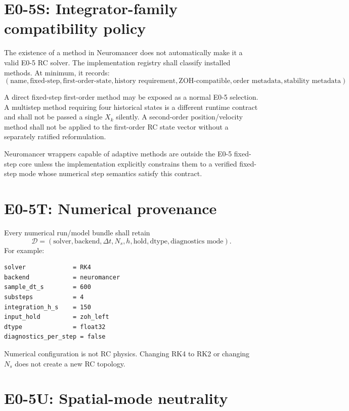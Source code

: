 \documentclass[11pt]{article}
\begin{document}
\section{E0-5S: Integrator-family compatibility policy}

The existence of a method in Neuromancer does not automatically make it a valid
E0-5 RC solver. The implementation registry shall classify installed methods.
At minimum, it records:
\[
(\text{name},\text{fixed-step},\text{first-order-state},\text{history requirement},
\text{ZOH-compatible},\text{order metadata},\text{stability metadata}).
\]

A direct fixed-step first-order method may be exposed as a normal E0-5 selection.
A multistep method requiring four historical states is a different runtime
contract and shall not be passed a single $X_k$ silently. A second-order
position/velocity method shall not be applied to the first-order RC state vector
without a separately ratified reformulation.

Neuromancer wrappers capable of adaptive methods are outside the E0-5 fixed-step
core unless the implementation explicitly constrains them to a verified fixed-step
mode whose numerical step semantics satisfy this contract.

\section{E0-5T: Numerical provenance}

Every numerical run/model bundle shall retain
\[
\boxed{
\mathcal D=
(\text{solver},\text{backend},\Delta t,N_s,h,\text{hold},\text{dtype},
\text{diagnostics mode}).
}
\]
For example:
\begin{verbatim}
solver             = RK4
backend            = neuromancer
sample_dt_s        = 600
substeps           = 4
integration_h_s    = 150
input_hold         = zoh_left
dtype              = float32
diagnostics_per_step = false
\end{verbatim}
Numerical configuration is not RC physics. Changing RK4 to RK2 or changing
$N_s$ does not create a new RC topology.

\section{E0-5U: Spatial-mode neutrality}
\end{document}
